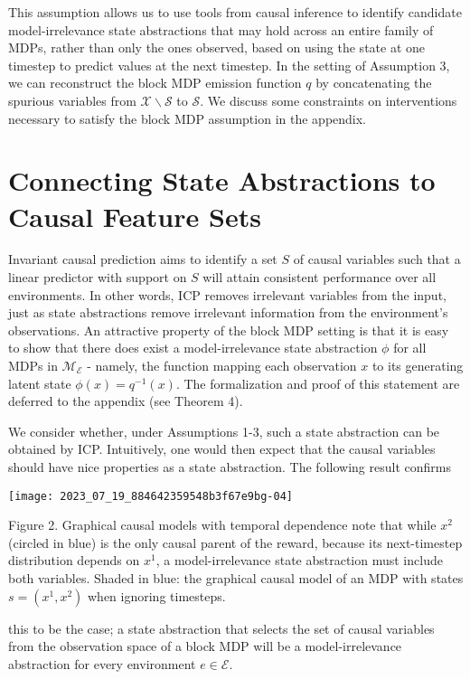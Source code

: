 \documentclass[10pt]{article}
\begin{document}
This assumption allows us to use tools from causal inference to identify candidate model-irrelevance state abstractions that may hold across an entire family of MDPs, rather than only the ones observed, based on using the state at one timestep to predict values at the next timestep. In the setting of Assumption 3, we can reconstruct the block MDP emission function $q$ by concatenating the spurious variables from $\mathcal{X} \backslash \mathcal{S}$ to $\mathcal{S}$. We discuss some constraints on interventions necessary to satisfy the block MDP assumption in the appendix.

\section{Connecting State Abstractions to Causal Feature Sets}
Invariant causal prediction aims to identify a set $S$ of causal variables such that a linear predictor with support on $S$ will attain consistent performance over all environments. In other words, ICP removes irrelevant variables from the input, just as state abstractions remove irrelevant information from the environment's observations. An attractive property of the block MDP setting is that it is easy to show that there does exist a model-irrelevance state abstraction $\phi$ for all MDPs in $\mathcal{M}_{\mathcal{E}}$ - namely, the function mapping each observation $x$ to its generating latent state $\phi(x)=q^{-1}(x)$. The formalization and proof of this statement are deferred to the appendix (see Theorem 4).

We consider whether, under Assumptions 1-3, such a state abstraction can be obtained by ICP. Intuitively, one would then expect that the causal variables should have nice properties as a state abstraction. The following result confirms

\begin{center}
\texttt{[image: 2023\_07\_19\_884642359548b3f67e9bg-04]}
\end{center}

Figure 2. Graphical causal models with temporal dependence note that while $x^{2}$ (circled in blue) is the only causal parent of the reward, because its next-timestep distribution depends on $x^{1}$, a model-irrelevance state abstraction must include both variables. Shaded in blue: the graphical causal model of an MDP with states $s=\left(x^{1}, x^{2}\right)$ when ignoring timesteps.

this to be the case; a state abstraction that selects the set of causal variables from the observation space of a block MDP will be a model-irrelevance abstraction for every environment $e \in \mathcal{E}$.
\end{document}
